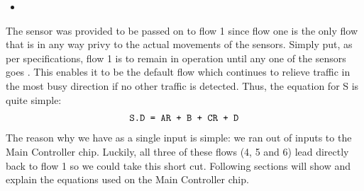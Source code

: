 \begin{itemize}
  \item \nS
\end{itemize}
The sensor \nS was provided to be passed on to flow 1 since flow
one is the only flow that is in any way privy to the actual movements of the
sensors. Simply put, as per specifications, flow 1 is to remain in operation
until any one of the sensors goes \HIGH. This enables it to be the default flow
which continues to relieve traffic in the most busy direction if no other
traffic is detected. Thus, the equation for S is quite simple:
\begin{align}\texttt{S.D = \AR + \B + \CR + \D}\end{align}
The reason why we have  as a single input is simple: we ran out of
inputs to the Main Controller chip. Luckily, all three of these flows (4, 5 and
6) lead directly back to flow 1 so we could take this short cut. Following
sections will show and explain the equations used on the Main Controller chip.